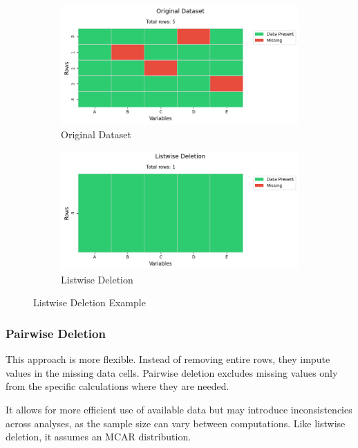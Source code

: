 \documentclass[a4paper,12pt]{article}
\begin{document}
\begin{figure}[H]
\centering
\begin{subfigure}{0.48\textwidth}
\includegraphics[width=\linewidth]{original_dataset.png}
\caption{Original Dataset}
\end{subfigure}
\hfill
\begin{subfigure}{0.48\textwidth}
\includegraphics[width=\linewidth]{listwise_deletion.png}
\caption{Listwise Deletion}
\end{subfigure}
\caption{Listwise Deletion Example}
\end{figure}


\subsubsection{Pairwise Deletion}

This approach is more flexible. Instead of removing entire rows, they impute values in the missing data cells. Pairwise deletion excludes missing values only from the specific calculations where they are needed.

It allows for more efficient use of available data but may introduce inconsistencies across analyses, as the sample size can vary between computations. Like listwise deletion, it assumes an MCAR distribution. ~\cite{3}
\end{document}
